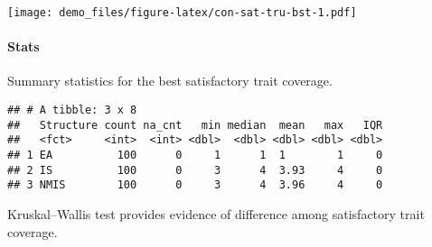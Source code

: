 \documentclass[]{book}
\newenvironment{Shaded}{\begin{snugshade}}{\end{snugshade}}
\newcommand{\CharTok}[1]{\textcolor[rgb]{0.31,0.60,0.02}{#1}}
\newcommand{\CommentTok}[1]{\textcolor[rgb]{0.56,0.35,0.01}{\textit{#1}}}
\newcommand{\DataTypeTok}[1]{\textcolor[rgb]{0.13,0.29,0.53}{#1}}
\newcommand{\KeywordTok}[1]{\textcolor[rgb]{0.13,0.29,0.53}{\textbf{#1}}}
\newcommand{\NormalTok}[1]{#1}
\newcommand{\OperatorTok}[1]{\textcolor[rgb]{0.81,0.36,0.00}{\textbf{#1}}}
\newcommand{\OtherTok}[1]{\textcolor[rgb]{0.56,0.35,0.01}{#1}}
\newcommand{\StringTok}[1]{\textcolor[rgb]{0.31,0.60,0.02}{#1}}
\let\oldparagraph\paragraph
\renewcommand{\paragraph}[1]{\oldparagraph{#1}\mbox{}}
\begin{document}
\texttt{[image: demo\_files/figure-latex/con-sat-tru-bst-1.pdf]}

\hypertarget{stats-8}{%
\paragraph{Stats}\label{stats-8}}

Summary statistics for the best satisfactory trait coverage.

\begin{Shaded}
\end{Shaded}

\begin{verbatim}
## # A tibble: 3 x 8
##   Structure count na_cnt   min median  mean   max   IQR
##   <fct>     <int>  <int> <dbl>  <dbl> <dbl> <dbl> <dbl>
## 1 EA          100      0     1      1  1        1     0
## 2 IS          100      0     3      4  3.93     4     0
## 3 NMIS        100      0     3      4  3.96     4     0
\end{verbatim}

Kruskal--Wallis test provides evidence of difference among satisfactory trait coverage.
\end{document}
